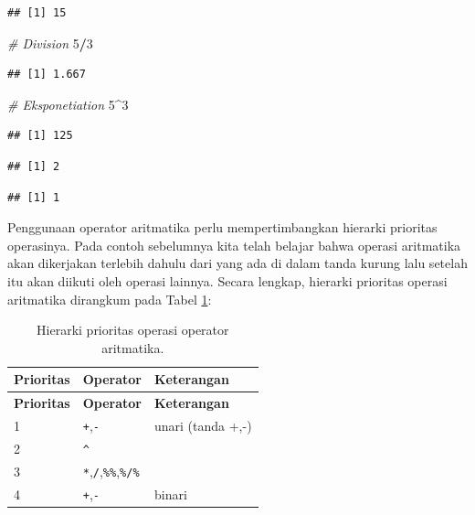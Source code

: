 \documentclass[12pt,]{krantz}
\newenvironment{Shaded}{\begin{snugshade}}{\end{snugshade}}
\newcommand{\CommentTok}[1]{\textcolor[rgb]{0.56,0.35,0.01}{\textit{#1}}}
\newcommand{\DecValTok}[1]{\textcolor[rgb]{0.00,0.00,0.81}{#1}}
\newcommand{\OperatorTok}[1]{\textcolor[rgb]{0.81,0.36,0.00}{\textbf{#1}}}
\begin{document}
\begin{verbatim}
## [1] 15
\end{verbatim}

\begin{Shaded}
\begin{Highlighting}[]
\CommentTok{# Division}
\DecValTok{5}\OperatorTok{/}\DecValTok{3}
\end{Highlighting}
\end{Shaded}

\begin{verbatim}
## [1] 1.667
\end{verbatim}

\begin{Shaded}
\begin{Highlighting}[]
\CommentTok{# Eksponetiation}
\DecValTok{5}\OperatorTok{^}\DecValTok{3}
\end{Highlighting}
\end{Shaded}

\begin{verbatim}
## [1] 125
\end{verbatim}

\begin{Shaded}
\end{Shaded}

\begin{verbatim}
## [1] 2
\end{verbatim}

\begin{Shaded}
\end{Shaded}

\begin{verbatim}
## [1] 1
\end{verbatim}

Penggunaan operator aritmatika perlu mempertimbangkan hierarki prioritas operasinya. Pada contoh sebelumnya kita telah belajar bahwa operasi aritmatika akan dikerjakan terlebih dahulu dari yang ada di dalam tanda kurung lalu setelah itu akan diikuti oleh operasi lainnya. Secara lengkap, hierarki prioritas operasi aritmatika dirangkum pada Tabel \ref{tab:hieraritop}:

\begin{longtable}[]{@{}lll@{}}
\caption{\label{tab:hieraritop} Hierarki prioritas operasi operator aritmatika.}\tabularnewline
\toprule
\textbf{Prioritas} & \textbf{Operator} & \textbf{Keterangan}\tabularnewline
\midrule
\endfirsthead
\toprule
\textbf{Prioritas} & \textbf{Operator} & \textbf{Keterangan}\tabularnewline
\midrule
\endhead
1 & \texttt{+},\texttt{-} & unari (tanda +,-)\tabularnewline
2 & \texttt{\^{}} &\tabularnewline
3 & \texttt{*},\texttt{/},\texttt{\%\%},\texttt{\%/\%} &\tabularnewline
4 & \texttt{+},\texttt{-} & binari\tabularnewline
\bottomrule
\end{longtable}
\end{document}
